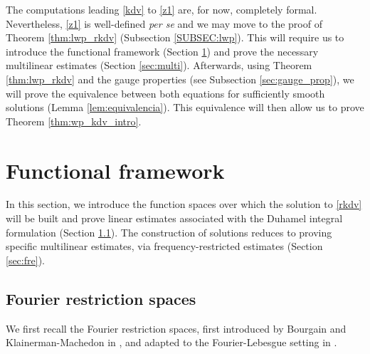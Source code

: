 \documentclass[a4paper,
11pt,  reqno]{amsart}
\newcommand{\5}{\textup{V}}
\theoremstyle{remark}
\numberwithin{equation}{section}
\numberwithin{theorem}{section}
\begin{document}
{
The computations leading \eqref{kdv} to \eqref{z1} are, for now, completely formal. Nevertheless, \eqref{z1} is well-defined \emph{per se} and we may move to the proof of Theorem \ref{thm:lwp_rkdv} (Subsection \ref{SUBSEC:lwp}). This will require us to introduce the functional framework (Section \ref{sec:functional}) and prove the necessary multilinear estimates (Section \ref{sec:multi}). Afterwards, using Theorem \ref{thm:lwp_rkdv} and the gauge properties (see Subsection \ref{sec:gauge_prop}), we will prove the equivalence between both equations for sufficiently smooth solutions (Lemma \ref{lem:equivalencia}). This equivalence will then allow us to prove Theorem \ref{thm:wp_kdv_intro}.
}



	\section{Functional framework}\label{sec:functional}

	In this section, we introduce the function spaces over which the solution to \eqref{rkdv} will be built and prove linear estimates associated with the Duhamel integral formulation (Section \ref{sec:fourier_restr}). The construction of solutions reduces to proving specific multilinear estimates, via frequency-restricted estimates (Section \ref{sec:fre}).


	\subsection{Fourier restriction spaces}\label{sec:fourier_restr}

	We first recall the Fourier restriction spaces,
     first introduced by Bourgain \cite{bourg1, bourg2} and Klainerman-Machedon in \cite{KlainermanMachedon}, and adapted to the Fourier-Lebesgue setting in \cite{Grunrock_mkdv, HerrGrunrock_FL}.
\end{document}
